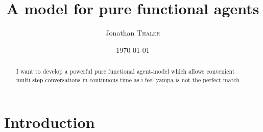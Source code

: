 \documentclass{article}
\title{A model for pure functional agents} %
\author{Jonathan \textsc{Thaler}}
\date{\today}
\begin{document}
\maketitle 

\begin{abstract}
I want to develop a powerful pure functional agent-model which allows convenient multi-step conversations in continuous time as i feel yampa is not the perfect match
\end{abstract}

\section{Introduction}






\end{document}

